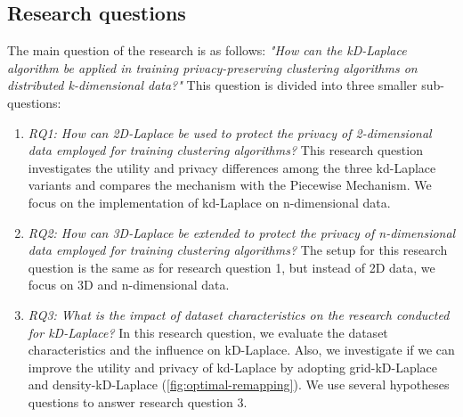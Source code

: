 \subsection{Research questions}
The main question of the research is as follows: \newline \newline
\textit{"How can the kD-Laplace algorithm be applied in training privacy-preserving clustering algorithms on distributed k-dimensional data?"} \newline
This question is divided into three smaller sub-questions:
\begin{enumerate}
  \item \textit{RQ1: How can 2D-Laplace be used to protect the privacy of 2-dimensional data employed for training clustering algorithms?} \newline
        This research question investigates the utility and privacy differences among the three kd-Laplace variants and compares the mechanism with the Piecewise Mechanism.
        We focus on the implementation of kd-Laplace on n-dimensional data.
  \item \textit{RQ2: How can 3D-Laplace be extended to protect the privacy of n-dimensional data employed for training clustering algorithms?} \newline
        The setup for this research question is the same as for research question 1, but instead of 2D data, we focus on 3D and n-dimensional data.
  \item \textit{RQ3: What is the impact of dataset characteristics on the research conducted for kD-Laplace?} \newline
        In this research question, we evaluate the dataset characteristics and the influence on kD-Laplace.
        Also, we investigate if we can improve the utility and privacy of kd-Laplace by adopting grid-kD-Laplace and density-kD-Laplace (\ref{fig:optimal-remapping}).
        We use several hypotheses questions to answer research question 3.


\end{enumerate}
